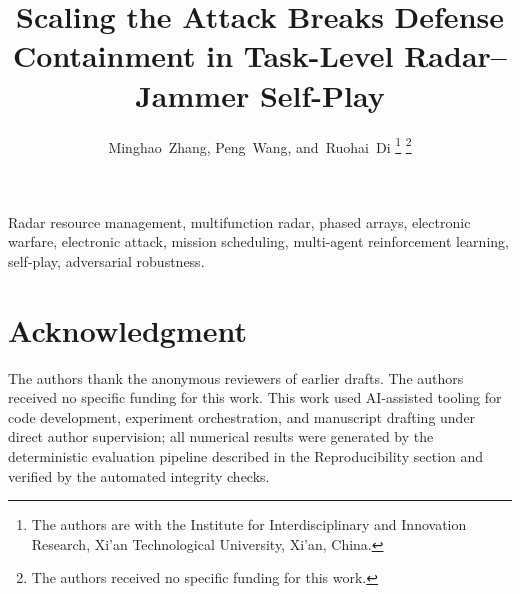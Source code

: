 \documentclass[journal]{IEEEtran}
\title{Scaling the Attack Breaks Defense Containment in Task-Level Radar--Jammer Self-Play}
\author{Minghao~Zhang,
        Peng~Wang,
        and~Ruohai~Di%
\thanks{The authors are with the Institute for Interdisciplinary and Innovation
Research, Xi'an Technological University, Xi'an, China.}%
\thanks{The authors received no specific funding for this work.}}
\begin{document}
\maketitle
\begin{abstract}

\end{abstract}

\begin{IEEEkeywords}
Radar resource management, multifunction radar, phased arrays, electronic warfare, electronic attack, mission scheduling, multi-agent reinforcement learning, self-play, adversarial robustness.
\end{IEEEkeywords}








\section*{Acknowledgment}
The authors thank the anonymous reviewers of earlier drafts. The authors
received no specific funding for this work. This work used AI-assisted
tooling for code development, experiment orchestration, and manuscript
drafting under direct author supervision; all numerical results were
generated by the deterministic evaluation pipeline described in the
Reproducibility section and verified by the automated integrity checks.



\end{document}
